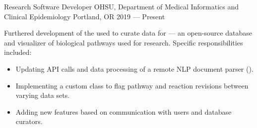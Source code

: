 \showoff
{Research Software Developer}
{OHSU, Department of Medical Informatics and Clinical Epidemiology}
{Portland, OR}
{2019 --- Present}

Furthered development of the  used to curate data for  --- an open-source database and visualizer of biological pathways used for research. Specific responsibilities included:

\begin{itemize}[label=$\triangleright$]
    \item Updating API calls and data processing of a remote NLP document parser ().
    \item Implementing a custom class to flag pathway and reaction revisions between varying data sets.
    \item Adding new features based on communication with users and database curators.
\end{itemize}

